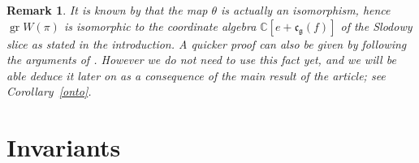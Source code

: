 \documentclass[twoside,12pt,reqno]{amsart}
\makeatletter
\newif\ifcenters@
\newtheorem{Remark}[Proposition]{Remark}
\def\C{{\mathbb C}}
\def\pr{{\operatorname{pr}}}
\def\gr{\operatorname{gr}}
\def\End{{\operatorname{End}}}
\makeatother
\begin{document}
\begin{Remark}\rm
It is known by \cite[Theorem 2.3]{Ly} that the map
$\theta$ is actually an {\em isomorphism},
hence $\gr W(\pi)$ is isomorphic to the coordinate algebra
$\C[e+\mathfrak{c}_{\mathfrak{g}}(f)]$ of the Slodowy slice
as stated in the introduction.
A quicker proof can also be given by 
following the arguments of \cite[$\S$5]{GG}.
However we do not need to use this fact yet, and we will be able
deduce it
later on as a consequence of the main result of the article; see
Corollary~\ref{onto}.
\end{Remark}

\ifcenters@
\begin{Remark}\label{centinj}\rm
The restriction of the map $\pr_\chi:U(\mathfrak{g}) 
\rightarrow U(\mathfrak{p})$ to 
$Z(U(\mathfrak{g}))$ defines an injective
algebra homomorphism $\psi:Z(U(\mathfrak{g})) \hookrightarrow
W(\pi)$ whose image is contained in the center $Z(W(\pi))$.
The fact that $\psi$ is an algebra homomorphism 
with image contained in $Z(W(\pi))$ is easiest to
see using the definition of
$W(\pi)$ as the endomorphism algebra $\End_{U(\mathfrak{g})}(Q_\chi)$
given in the introduction, since in those terms
$\psi$ is just the representation
$Z(U(\mathfrak{g})) \rightarrow \End_{\C}(Q_\chi)$ 
of $Z(U(\mathfrak{g}))$ on the module $Q_\chi$.
The fact that $\psi$ is injective
is proved in \cite[6.2]{P} or \cite[Proposition 2.6]{Ly}
by observing that the (injective) Harish-Chandra homomorphism
factors through the map $\psi$.
In \cite[$\S$6]{BK2} we show moreover using some basic facts 
about the representation theory of $W(\pi)$ (some of 
the proofs of which depend on
knowing the main result of the article below)
that the image of $\psi$ is actually
{\em equal to} $Z(W(\pi))$. 
Hence, $\psi:Z(U(\mathfrak{g})) \rightarrow Z(W(\pi))$
is actually an {\em isomorphism}.
\end{Remark}
\fi

\section{Invariants}\label{sinvariants}
\end{document}
